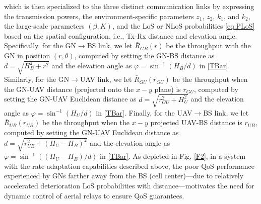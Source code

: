 \documentclass[12pt, draftcls, onecolumn]{IEEEtran}
\theoremstyle{plain}
\theoremstyle{definition}
\theoremstyle{remark}
\begin{document}
which is then specialized to the three distinct communication links by expressing the transmission powers, the environment-specific parameters $z_{1}$, $z_{2}$, $k_{1}$, and $k_{2}$, the large-scale parameters $(\beta,K)$, and the LoS or NLoS probabilities \eqref{eq:PLoS} based on the spatial configuration, i.e., Tx-Rx distance and elevation angle. Specifically, for the GN$\rightarrow$BS link, we let $\bar{R}_{GB}(r)$ be the throughput with the GN in position $(r,\theta)$, computed by setting the GN-BS distance as $d{=}\sqrt{H_{B}^{2}{+}r^{2}}$ and the elevation angle as $\varphi{=}\sin^{-1}\left(H_{B}/d\right)$ in \eqref{TBar}. Similarly, for the GN$\rightarrow$UAV link, we let $\bar{R}_{GU}(r_{GU})$ be the throughput when the GN-UAV distance (projected onto the $x{-}y$ plane) is $r_{GU}$, computed by setting the GN-UAV Euclidean distance as $d{=}\sqrt{r_{GU}^{2}{+}H_{U}^{2}}$ and the elevation angle as $\varphi{=}\sin^{-1}\left(H_{U}/d\right)$ in \eqref{TBar}. Finally, for the UAV$\rightarrow$BS link, we let $\bar{R}_{UB}(r_{UB})$ be the throughput when the $x{-}y$ projected UAV-BS distance is $r_{UB}$, computed by setting the GN-UAV Euclidean distance as $d{=}\sqrt{r_{UB}^{2}{+}(H_{U}{-}H_{B})^{2}}$ and the elevation angle as $\varphi{=}\sin^{-1}\left((H_{U}{-}H_{B})/d\right)$ in \eqref{TBar}. As depicted in Fig. \ref{F2}, in a system with the rate adaptation capabilities described above, the poor QoS performance experienced by GNs farther away from the BS (cell center)---due to relatively accelerated deterioration LoS probabilities with distance---motivates the need for dynamic control of aerial relays to ensure QoS guarantees.
\end{document}
